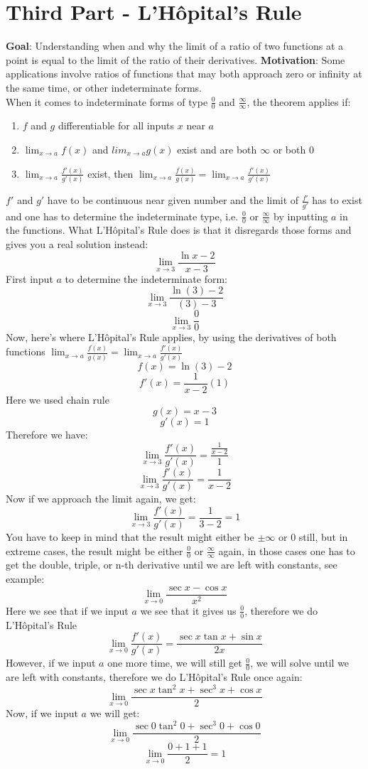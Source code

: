 \documentclass[12pt, letterpaper]{article}
\begin{document}
\section{Third Part - L'Hôpital's Rule}
\textbf{Goal}: Understanding when and why the limit of a ratio of two functions at a point is equal to the limit of the ratio of their derivatives.
\textbf{Motivation}: Some applications involve ratios of functions that may both approach zero or infinity at the same time, or other indeterminate forms.\\
\newline
When it comes to indeterminate forms of type \(\frac{0}{0}\) and \(\frac{\infty}{\infty}\), the theorem applies if:
\begin{enumerate}
    \item \(f\) and \(g\) differentiable for all inputs \(x\) near \(a\)
    \item \(\lim_{x \to a} f(x)\) and \(lim_{x \to a} g(x)\) exist and are both \(\infty\) or both \(0\)
    \item \(\lim_{x \to a}\frac{f'(x)}{g'(x)}\) exist, then \(\lim_{x \to a}\frac{f(x)}{g(x)} = \lim_{x \to a}\frac{f'(x)}{g'(x)}\) 
\end{enumerate}
\(f'\) and \(g'\) have to be continuous near given number and the limit of \(\frac{f'}{g'}\) has to exist and one has to determine the indeterminate type, i.e. \(\frac{0}{0}\) or \(\frac{\infty}{\infty}\) by inputting \(a\) in the functions. What L'Hôpital's Rule does is that it disregards those forms and gives you a real solution instead: 
\[\lim_{x \to 3}\frac{\ln{x-2}}{x-3}\]
First input \(a\) to determine the indeterminate form:
\[\lim_{x \to 3}\frac{\ln{(3)-2}}{(3)-3}\]
\[\lim_{x \to 3}\frac{0}{0}\]
Now, here's where L'Hôpital's Rule applies, by using the derivatives of both functions \(\lim_{x \to a}\frac{f(x)}{g(x)} = \lim_{x \to a}\frac{f'(x)}{g'(x)}\)
\[f(x) = \ln{(3)-2}\]
\[f'(x) = \frac{1}{x-2}(1)\]
Here we used chain rule
\[g(x) = x-3\]
\[g'(x) = 1\]
Therefore we have:
\[\lim_{x \to 3}\frac{f'(x)}{g'(x)} = \frac{\frac{1}{x-2}}{1}\]
\[\lim_{x \to 3}\frac{f'(x)}{g'(x)} = \frac{1}{x-2}\]
Now if we approach the limit again, we get:
\[\lim_{x \to 3}\frac{f'(x)}{g'(x)} = \frac{1}{3-2} = 1\]
You have to keep in mind that the result might either be \(\pm \infty\) or \(0\) still, but in extreme cases, the result might be either \(\frac{0}{0}\) or \(\frac{\infty}{\infty}\) again, in those cases one has to get the double, triple, or n-th derivative until we are left with constants, see example:
\[\lim_{x \to 0} \frac{\sec{x}-\cos{x}}{x^2}\]
Here we see that if we input \(a\) we see that it gives us \(\frac{0}{0}\), therefore we do L'Hôpital's Rule
\[\lim_{x \to 0}\frac{f'(x)}{g'(x)} = \frac{\sec{x}\tan{x}+\sin{x}}{2x}\]
However, if we input \(a\) one more time, we will still get \(\frac{0}{0}\), we will solve until we are left with constants, therefore we do L'Hôpital's Rule once again:
\[\lim_{x \to 0} \frac{\sec{x}\tan^2{x}+\sec^3{x}+\cos{x}}{2}\]
Now, if we input \(a\) we will get:
\[\lim_{x \to 0} \frac{\sec{0}\tan^2{0}+\sec^3{0}+\cos{0}}{2}\]
\[\lim_{x \to 0} \frac{0+1+1}{2} = 1\]
\end{document}
